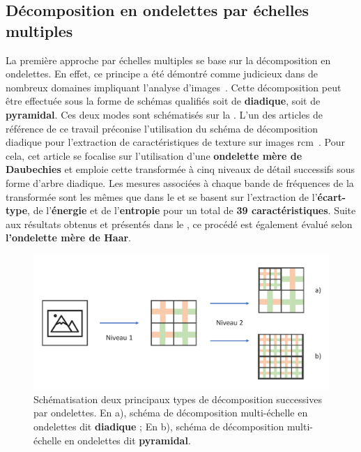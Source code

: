 \subsection{Décomposition en ondelettes par échelles multiples}
La première approche par échelles multiples se base sur la décomposition en ondelettes. En effet, ce principe a été démontré comme judicieux dans de nombreux domaines impliquant l'analyse d'images~\cite{Carvalho2004}. Cette décomposition peut être effectuée sous la forme de schémas qualifiés soit de \textbf{diadique}, soit de \textbf{pyramidal}. Ces deux modes sont schématisés sur la . L'un des articles de référence de ce travail préconise l'utilisation du schéma de décomposition diadique pour l'extraction de caractéristiques de texture sur images \gls{rcm}~\cite{Wiltgen2008}. Pour cela, cet article se focalise sur l'utilisation d'une \textbf{ondelette mère de Daubechies} et emploie cette transformée à cinq niveaux de détail successifs sous forme d'arbre diadique. Les mesures associées à chaque bande de fréquences de la transformée sont les mêmes que dans le  et se basent sur l'extraction de l'\textbf{écart-type}, de l'\textbf{énergie} et de l'\textbf{entropie} pour un total de \textbf{39 caractéristiques}. Suite aux résultats obtenus et présentés dans le , ce procédé est également évalué selon \textbf{l'ondelette mère de Haar}.\par

\begin{figure}[H]
    \centering
    \includegraphics[width=\textwidth]{contents/chapter_6/resources/scheme_image_improvement_dwt_decomposition.pdf}
    \caption{Schématisation deux principaux types de décomposition successives par ondelettes. En a), schéma de décomposition multi-échelle en ondelettes dit \textbf{diadique} ; En b), schéma de décomposition multi-échelle en ondelettes dit \textbf{pyramidal}.}
    \label{fig:scheme_image_improvement_dwt_decomposition}
\end{figure}\par

